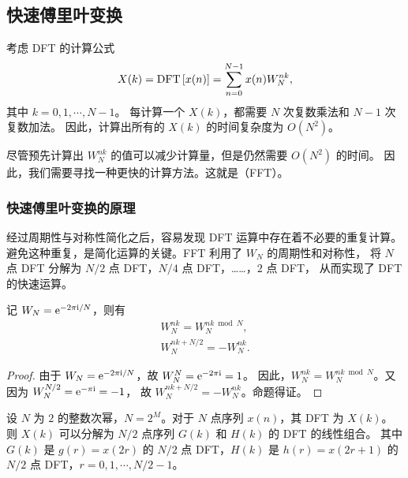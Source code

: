\subsection{快速傅里叶变换}

考虑 DFT 的计算公式
\begin{align*}
    X(k) = \mathrm{DFT}\left[x(n)\right] = \sum_{n = 0}^{N - 1}x(n)W_N^{nk},
\end{align*}
其中 $k = 0, 1, \cdots, N - 1$。
每计算一个 $X(k)$，都需要 $N$ 次复数乘法和 $N - 1$ 次复数加法。
因此，计算出所有的 $X(k)$ 的时间复杂度为 $O(N^2)$。

尽管预先计算出 $W_N^{nk}$ 的值可以减少计算量，但是仍然需要 $O(N^2)$ 的时间。
因此，我们需要寻找一种更快的计算方法。这就是（FFT）。

\subsubsection{快速傅里叶变换的原理}

经过周期性与对称性简化之后，容易发现 DFT 运算中存在着不必要的重复计算。
避免这种重复，是简化运算的关键。FFT 利用了 $W_N$ 的周期性和对称性，
将 $N$ 点 DFT 分解为 $N/2$ 点 DFT，$N/4$ 点 DFT，……，$2$ 点 DFT，
从而实现了 DFT 的快速运算。

\begin{property}[$W_N^{nk}$ 的性质]
    记 $W_N = \mathrm{e}^{-2\pi\mathrm{i} / N}$，则有
    \begin{align*}
        W_N^{nk} = W_N^{nk \bmod N}, \\
        W_N^{nk + N/2} = -W_N^{nk}.
    \end{align*}
\end{property}

\begin{proof}
    由于 $W_N = \mathrm{e}^{-2\pi\mathrm{i} / N}$，故 $W_N^N = \mathrm{e}^{-2\pi\mathrm{i}} = 1$。
    因此，$W_N^{nk} = W_N^{nk \bmod N}$。又因为 $W_N^{N/2} = \mathrm{e}^{-\pi\mathrm{i}} = -1$，
    故 $W_N^{nk + N/2} = -W_N^{nk}$。命题得证。
\end{proof}

\begin{theorem}
    设 $N$ 为 $2$ 的整数次幂，$N = 2^M$。对于 $N$ 点序列 $x(n)$，其 DFT 为 $X(k)$。
    则 $X(k)$ 可以分解为 $N/2$ 点序列 $G(k)$ 和 $H(k)$ 的 DFT 的线性组合。
    其中 $G(k)$ 是 $g(r) = x(2r)$ 的 $N/2$ 点 DFT，$H(k)$
    是 $h(r) = x(2r + 1)$ 的 $N/2$ 点 DFT，$r = 0, 1, \cdots, N/2 - 1$。
\end{theorem}

